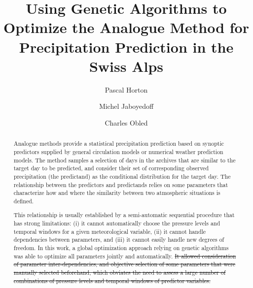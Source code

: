 \documentclass[review]{elsarticle}
\providecommand{\DIFaddtex}[1]{{\protect\color{blue}\uwave{#1}}} %
\providecommand{\DIFdeltex}[1]{{\protect\color{red}\sout{#1}}}                      %
\providecommand{\DIFaddbegin}{} %
\providecommand{\DIFaddend}{} %
\providecommand{\DIFdelbegin}{} %
\providecommand{\DIFdelend}{} %
\providecommand{\DIFadd}[1]{\texorpdfstring{\DIFaddtex{#1}}{#1}} %
\providecommand{\DIFdel}[1]{\texorpdfstring{\DIFdeltex{#1}}{}} %
\begin{document}
\begin{frontmatter}

\title{Using Genetic Algorithms to Optimize the Analogue Method for Precipitation Prediction in the Swiss Alps}

\author[unil,unibe,terranum]{Pascal Horton}

\author[unil]{Michel Jaboyedoff}
\author[lthe]{Charles Obled}

\address[unil]{University of Lausanne, Institute of Earth Sciences, Lausanne, Switzerland}
\address[unibe]{University of Bern, Oeschger Centre for Climate Change Research, Institute of Geography, Bern, Switzerland}
\address[lthe]{Universit\'{e} de Grenoble-Alpes, LTHE, Grenoble, France}

\begin{abstract}
	Analogue methods provide a statistical precipitation prediction based on synoptic predictors supplied by general circulation models or numerical weather prediction models. The method samples a selection of days in the archives that are similar to the target day to be predicted, and consider their set of corresponding observed precipitation (the predictand) as the conditional distribution for the target day. The relationship between the predictors and predictands relies on some parameters that characterize how and where the similarity between two atmospheric situations is defined.

	This relationship is usually established by a semi-automatic sequential procedure that has strong limitations: (i) it cannot automatically choose the pressure levels and temporal windows \DIFaddbegin \DIFadd{(hour of the day) }\DIFaddend for a given meteorological variable, (ii) it cannot handle dependencies between parameters, and (iii) it cannot easily handle new degrees of freedom. In this work, a global optimization approach relying on genetic algorithms was able to optimize all parameters jointly and automatically. 
	\DIFdelbegin \DIFdel{It allowed consideration of parameter inter-dependencies, and objective selection of some parameters that were manually selected beforehand, which obviates the need to assess a large number of combinations of pressure levels and temporal windows of predictor variables.
	}\DIFdelend 


\end{abstract}
\end{frontmatter}
\end{document}
